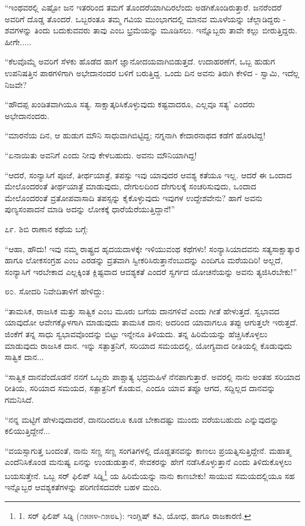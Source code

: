 “ಇಂಥವರಲ್ಲಿ ಎಷ್ಟೋ ಜನ ಇತರರಿಂದ ತಮಗೆ ತೊಂದರೆಯಾಗಿದಿರಲೆಂದು ಅಡಗಿಕೊಂಡಿರುತ್ತಾರೆ. ಜನರೆಂದರೆ ಅವರಿಗೆ ದೊಡ್ಡ ತೊಂದರೆ. ಒಬ್ಬರಂತೂ ತಮ್ಮ ಗವಿಯ ಮುಂಭಾಗದಲ್ಲಿ ಮಾನವ ಮೂಳೆಯನ್ನು ಚೆಲ್ಲಾಡಿದ್ದರು - ಶವಗಳನ್ನು ತಿಂದು ಬದುಕುವವರು ತಾವು ಎಂಬ ಭ್ರಮೆಯನ್ನು ಮೂಡಿಸಲು. ಇನ್ನೊಬ್ಬರು ತಾವೇ ಕಲ್ಲು ಬೀರುತ್ತಿದ್ದರು. ಹೀಗೇ.....

“ಕೆಲವೊಮ್ಮೆ ಅವರಿಗೆ ಸೆಳಕು ಹೊಡೆದ ಹಾಗೆ ಜ್ಞಾನೋದಯವಾಗಿಬಿಡುತ್ತದೆ. ಉದಾಹರಣೆಗೆ, ಒಬ್ಬ ಹುಡುಗ ಉಪನಿಷತ್ತಿನ ಪಾಠಗಳಿಗಾಗಿ ಅಭೇದಾನಂದರ ಬಳಿಗೆ ಬರುತ್ತಿದ್ದ. ಒಂದು ದಿನ ಅವನು ತಿರುಗಿ ಕೇಳಿದ - ಸ್ವಾಮಿ, ಇದೆಲ್ಲ ನಿಜವೇ?

“ಹೌದಪ್ಪ ಖಂಡಿತವಾಗಿಯೂ ಸತ್ಯ. ಸಾಕ್ಷಾತ್ಕರಿಸಿಕೊಳ್ಳುವುದು ಕಷ್ಟವಾದರೂ, ಎಲ್ಲವೂ ಸತ್ಯ’ ಎಂದರು ಅಭೇದಾನಂದರು.

“ಮಾರನೆಯ ದಿನ, ಆ ಹುಡುಗ ಮೌನಿ ಸಾಧುವಾಗಿಬಿಟ್ಟಿದ್ದ; ನಗ್ನನಾಗಿ ಕೇದಾರನಾಥದ ಕಡೆಗೆ ಹೊರಟಿದ್ದ!

“ಏನಾಯಿತು ಅವನಿಗೆ ಎಂದು ನೀವು ಕೇಳಬಹುದು. ಅವನು ಮೌನಿಯಾಗಿದ್ದ!

“ಆದರೆ, ಸಂನ್ಯಾಸಿಗೆ ಪೂಜೆ, ತೀರ್ಥಯಾತ್ರೆ, ತಪಸ್ಸು ಇವು ಯಾವುದರ ಆವಶ್ಯ ಕತೆಯೂ ಇಲ್ಲ. ಆದರೆ ಈ ಒಂದಾದ ಮೇಲೊಂದರಂತೆ ತೀರ್ಥಯಾತ್ರೆ ಮಾಡುವುದು, ದೇಗುಲದಿಂದ ದೇಗುಲಕ್ಕೆ ಸಂಚರಿಸುವುದು, ಒಂದಾದ ಮೇಲೊಂದರಂತೆ ವ್ರತೋಪವಾಸಾದಿ ತಪಸ್ಸನ್ನು ಕೈಕೊಳ್ಳುವುದು ಇವುಗಳ ಉದ್ದೇಶವೇನು? ಹಾಗೆ ಅವನು ಪುಣ್ಯಸಂಪಾದನೆ ಮಾಡಿ ಅದನ್ನು ಲೋಕಕ್ಕೆ ಧಾರೆಯೆರೆಯುತ್ತಿದ್ದಾನೆ!” 

೭೯. ಶಿಬಿ ರಾಣಾನ ಕಥೆಯ ಬಗ್ಗೆ:

“ಆಹಾ, ಹೌದು! ಇವು ನಮ್ಮ ರಾಷ್ಟ್ರದ ಹೃದಯದಾಳಕ್ಕೇ ಇಳಿಯುವಂಥ ಕಥೆಗಳು! ಸಂನ್ಯಾಸಿಯಾದವನು ಸತ್ಯಸಾಕ್ಷಾತ್ಕಾರ ಹಾಗೂ ಲೋಕಸಂಗ್ರಹ ಎಂಬ ಎರಡನ್ನು ವ್ರತವಾಗಿ ಸ್ವೀಕರಿಸಿರುತ್ತಾನೆಂಬುದನ್ನು ಎಂದಿಗೂ ಮರೆಯದಿರಿ! ಅಲ್ಲದೆ, ಸಂನ್ಯಾಸಿಗೆ ಇರಬೇಕಾದ ಎಲ್ಲಕ್ಕಿಂತ ಕ್ಲಿಷ್ಟವಾದ ಆವಶ್ಯಕತೆ ಎಂದರೆ ಸ್ವರ್ಗದ ಯೋಚನೆಯನ್ನು ಅವನು ತ್ಯಜಿಸಿರಬೇಕು!” 

೮೦. ಸೋದರಿ ನಿವೇದಿತಾಳಿಗೆ ಹೇಳಿದ್ದು:

“ತಾಮಸಿಕ, ರಾಜಸಿಕ ಮತ್ತು ಸಾತ್ವಿಕ ಎಂಬ ಮೂರು ಬಗೆಯ ದಾನಗಳಿವೆ ಎಂದು ಗೀತೆ ಹೇಳುತ್ತದೆ. ಸ್ವಭಾವದ ಯಾವುದೋ ಆವೇಗಕ್ಕೊಳಗಾಗಿ ಮಾಡುವುದು ತಾಮಸಿಕ ದಾನ; ಅದರಿಂದ ಯಾವಾಗಲೂ ತಪ್ಪು ಆಗುತ್ತಲೇ ಇರುತ್ತದೆ. ಜಿಂಕೆಗೆ ತನ್ನ ಸಾಧು ಸ್ವಭಾವವೊಂದನ್ನು ಬಿಟ್ಟು ಇನ್ನೇನೂ ತಿಳಿಯದು. ತನ್ನ ಹಿರಿಮೆಯನ್ನು ಹೆಚ್ಚಿಸಿಕೊಳ್ಳಲು ಮಾಡುವುದು ರಾಜಸಿಕ ದಾನ. ಇನ್ನು ಸತ್ಪಾತ್ರನಿಗೆ, ಸರಿಯಾದ ಸಮಯದಲ್ಲಿ, ಯೋಗ್ಯವಾದ ರೀತಿಯಲ್ಲಿ ಕೊಡುವುದು ಸಾತ್ವಿಕ ದಾನ...

“ಸಾತ್ವಿಕ ದಾನವೆಂದೊಡನೆ ನನಗೆ ಒಬ್ಬರು ಪಾಶ್ಚಾತ್ಯ ಭದ್ರಮಹಿಳೆ ನೆನಪಾಗುತ್ತಾರೆ. ಅವರಲ್ಲಿ ನಾನು ಅಂತಹ ಸರಿಯಾದ ರೀತಿಯ, ಸರಿಯಾದ ಸಮಯದ, ಸತ್ಪಾತ್ರನಿಗೆ ಕೊಡುವ, ಎಂದೂ ಯಾವ ತಪ್ಪೂ ಆಗದ, ಸದ್ದಿಲ್ಲದ ದಾನವನ್ನು ಗಮನಿಸಿದೆ.

“ನನ್ನ ಮಟ್ಟಿಗೆ ಹೇಳುವುದಾದರೆ, ದಾನದಿಂದಲೂ ಕೂಡ ಬೇಕಾದಷ್ಟು ಮುಂದು ವರೆಯಬಹುದು ಎನ್ನುವುದನ್ನು ಕಲಿಯುತ್ತಿದ್ದೇನೆ...

“ವಯಸ್ಸಾಗುತ್ತ ಬಂದಂತೆ, ನಾನು ಸಣ್ಣ ಸಣ್ಣ ಸಂಗತಿಗಳಲ್ಲಿ ದೊಡ್ಡತನವನ್ನು ಕಾಣಲು ಪ್ರಯತ್ನಿಸುತ್ತಿದ್ದೇನೆ. ಮಹಾತ್ಮ ಎಂದೆನಿಸಿಕೊಂಡ ಮನುಷ್ಯ ಏನನ್ನು ಉಂಡುಡುತ್ತಾನೆ, ಸೇವಕರನ್ನು ಹೇಗೆ ನಡೆಸಿಕೊಳ್ಳುತ್ತಾನೆ ಎಂದು ತಿಳಿದುಕೊಳ್ಳಲು ಬಯಸುತ್ತೇನೆ. ಒಬ್ಬ ಸರ್ ಫಿಲಿಪ್ ಸಿಡ್ನಿ\footnote{1. ಸರ್ ಫಿಲಿಪ್ ಸಿಡ್ನಿ (೧೫೫೪-೧೫೮೬): ಇಂಗ್ಲಿಷ್ ಕವಿ, ಯೋಧ, ಹಾಗೂ ರಾಜಕಾರಣಿ.} ಯ ಹಿರಿಮೆಯನ್ನು ನಾನು ಕಾಣಬೇಕು! ಸಾಯುವ ಸಮಯದಲ್ಲಿಯೂ ಸಹ ಇನ್ನೊಬ್ಬರ ಆವಶ್ಯಕತೆಗಳನ್ನು ಪರಿಗಣಿಸದವರೇ ಬಹಳ ಮಂದಿ.


